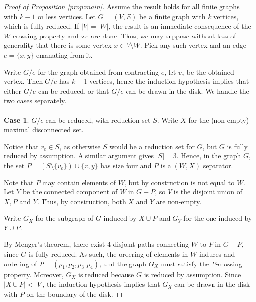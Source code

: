 \documentclass{article}
\numberwithin{equation}{section}
\theoremstyle{definition}
\theoremstyle{definition}
\theoremstyle{remark}
\begin{document}
\begin{appendices}
\begin{proof}[Proof of Proposition \ref{prop:main}]
    Assume the result holds for all finite graphs with $ k - 1$ or less vertices.
    Let $G = (V, E)$ be a finite graph with $k$ vertices, which is fully reduced. 
    If $|V| = |W|$, the result is an immediate consequence of the $W$-crossing property and we are done. 
    Thus, we may suppose without loss of generality that there is some vertex $x \in V \setminus W$. 
    Pick any such vertex and an edge $e = \{x, y\}$ emanating from it.
    
    Write $G / e$ for the graph obtained from contracting $e $, let $v_e$ be the obtained vertex. 
    Then $G / e$ has $k - 1$ vertices, hence the induction hypothesis implies that either $G / e$ can be reduced, 
    or that $G / e$ can be drawn in the disk. We handle the two cases separately. 
	\\
	\\
	\noindent \textbf{Case 1}. 
	$G / e$ can be reduced, with reduction set $S$.
    Write $X$ for the (non-empty) maximal disconnected set. 
    
    Notice that $v_e \in S$, as otherwise $S$ would be a reduction set for $G$, but $G$ is fully reduced by assumption. 
    A similar argument gives $|S| = 3$. 
    Hence, in the graph $G$, the set $P = (S \setminus \{v_e\}) \cup \{x, y\}$ has size four and $P$ is a $(W, X)$ separator. 
    
    Note that $P$ may contain elements of $W$, but by construction is not equal to $W$. 
    Let $Y$ be the connected component of $W$ in $G - P$, so $V$ is the disjoint union of $X, P$ and $Y$. 
    Thus, by construction, both $X$ and $Y$ are non-empty. 
    
    Write $G_X$ for the subgraph of $G$ induced by $X \cup P$ and $G_Y$ for the one induced by $Y \cup P$. 
    
    By Menger's theorem, there exist $4$ disjoint paths connecting $W$ to $P$ in $G - P$, 
    since $G$ is fully reduced. 
    As such, the ordering of elements in $W$ induces and ordering of $P = (p_1, p_2, p_3, p_4)$, 
    and the graph $G_X$ must satisfy the $P$-crossing property. 
    Moreover, $G_X$ is reduced because $G$ is reduced by assumption. 
    Since $|X \cup P| < |V|$, the induction hypothesis implies that $G_X$ can be drawn in the disk with $P$ on the boundary of the disk. 
    

\end{proof}
\end{appendices}
\end{document}
